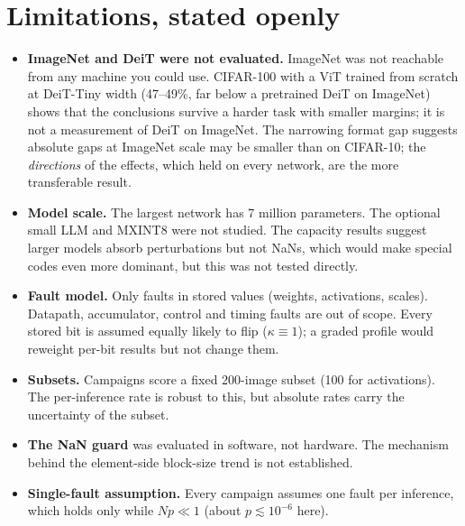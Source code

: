 \section{Limitations, stated openly}
\begin{itemize}
\item \textbf{ImageNet and DeiT were not evaluated.} ImageNet was not reachable from any machine you could use. CIFAR-100 with a ViT trained from scratch at DeiT-Tiny width (47--49\%, far below a pretrained DeiT on ImageNet) shows that the conclusions survive a harder task with smaller margins; it is not a measurement of DeiT on ImageNet.
 The narrowing format gap suggests absolute gaps at ImageNet scale may be smaller than on CIFAR-10; the \emph{directions} of the effects, which held on every network, are the more transferable result.
\item \textbf{Model scale.} The largest network has 7 million parameters. The optional small LLM and MXINT8 were not studied. The capacity results suggest larger models absorb perturbations but not NaNs, which would make special codes even more dominant, but this was not tested directly.
\item \textbf{Fault model.} Only faults in stored values (weights, activations, scales). Datapath, accumulator, control and timing faults are out of scope. Every stored bit is assumed equally likely to flip ($\kappa\equiv1$); a graded profile would reweight per-bit results but not change them.
\item \textbf{Subsets.} Campaigns score a fixed 200-image subset (100 for activations). The per-inference rate is robust to this, but absolute rates carry the uncertainty of the subset.
\item \textbf{The NaN guard} was evaluated in software, not hardware. The mechanism behind the element-side block-size trend is not established.
\item \textbf{Single-fault assumption.} Every campaign assumes one fault per inference, which holds only while $Np\ll1$ (about $p\lesssim10^{-6}$ here).
\end{itemize}


